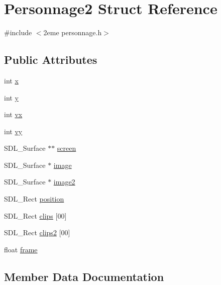\hypertarget{structPersonnage2}{}\section{Personnage2 Struct Reference}
\label{structPersonnage2}


{\ttfamily \#include $<$2eme personnage.\+h$>$}

\subsection*{Public Attributes}
\begin{DoxyCompactItemize}
\item 
int \hyperlink{structPersonnage2_ae1441c9154226c8f192692a60640ea6c}{x}
\item 
int \hyperlink{structPersonnage2_ac955392c8e030015e46517244e5987bd}{y}
\item 
int \hyperlink{structPersonnage2_aaf15cd6e8f9e8f75fcf079b8708f8ca3}{vx}
\item 
int \hyperlink{structPersonnage2_ab90fadbadf36db5de02082c7a2ee1aba}{vy}
\item 
S\+D\+L\+\_\+\+Surface $\ast$$\ast$ \hyperlink{structPersonnage2_a9ba0907380a892c9bc00b01cab744baf}{screen}
\item 
S\+D\+L\+\_\+\+Surface $\ast$ \hyperlink{structPersonnage2_a8b388edbf0064274aaee5c45b926b54b}{image}
\item 
S\+D\+L\+\_\+\+Surface $\ast$ \hyperlink{structPersonnage2_a185520d9aed81f2a5f1c157a2965b334}{image2}
\item 
S\+D\+L\+\_\+\+Rect \hyperlink{structPersonnage2_af34f6010776bf89a19c2a1af1400e885}{position}
\item 
S\+D\+L\+\_\+\+Rect \hyperlink{structPersonnage2_a70e37d07b50f6d4f576f31a968545afe}{clips} \mbox{[}00\mbox{]}
\item 
S\+D\+L\+\_\+\+Rect \hyperlink{structPersonnage2_aca4b0202064d5f466b3b3a6ba1e009b5}{clips2} \mbox{[}00\mbox{]}
\item 
float \hyperlink{structPersonnage2_a4256be539bf8145469f5d7189c768e9b}{frame}
\end{DoxyCompactItemize}


\subsection{Member Data Documentation}
\mbox{\label{structPersonnage2_a70e37d07b50f6d4f576f31a968545afe}} 

